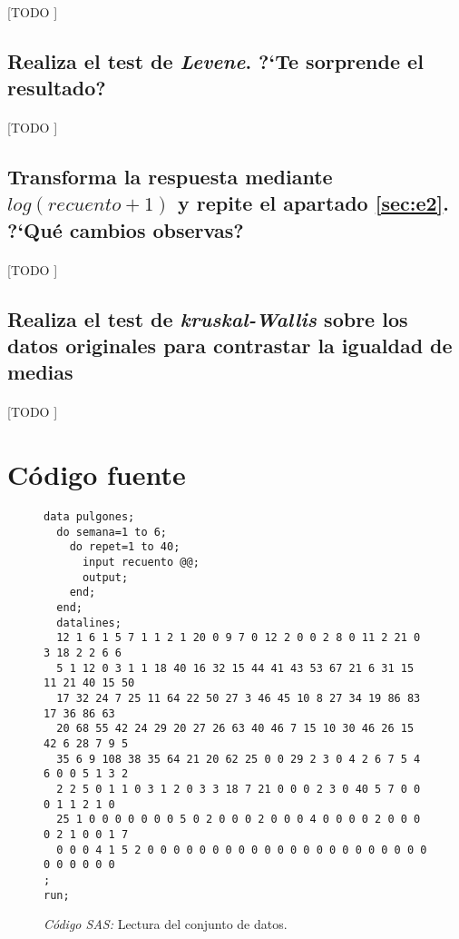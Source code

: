 \documentclass[11pt]{article}
\begin{document}
      \paragraph{}
      [TODO ]


    \subsection{Realiza el test de \emph{Levene}. ?`Te sorprende el resultado?}
    \label{sec:e3}

      \paragraph{}
      [TODO ]


    \subsection{Transforma la respuesta mediante $log(recuento + 1)$ y repite el apartado \ref{sec:e2}. ?`Qué cambios observas?}
    \label{sec:e4}

      \paragraph{}
      [TODO ]


    \subsection{Realiza el test de \emph{kruskal-Wallis} sobre los datos originales para contrastar la igualdad de medias}
    \label{sec:e5}
      \paragraph{}
      [TODO ]

  \section{Código fuente}
  \label{sec:code}

    \begin{figure}
      \centering
      \begin{verbatim}
data pulgones;
  do semana=1 to 6;
    do repet=1 to 40;
      input recuento @@;
      output;
    end;
  end;
  datalines;
  12 1 6 1 5 7 1 1 2 1 20 0 9 7 0 12 2 0 0 2 8 0 11 2 21 0 3 18 2 2 6 6
  5 1 12 0 3 1 1 18 40 16 32 15 44 41 43 53 67 21 6 31 15 11 21 40 15 50
  17 32 24 7 25 11 64 22 50 27 3 46 45 10 8 27 34 19 86 83 17 36 86 63
  20 68 55 42 24 29 20 27 26 63 40 46 7 15 10 30 46 26 15 42 6 28 7 9 5
  35 6 9 108 38 35 64 21 20 62 25 0 0 29 2 3 0 4 2 6 7 5 4 6 0 0 5 1 3 2
  2 2 5 0 1 1 0 3 1 2 0 3 3 18 7 21 0 0 0 2 3 0 40 5 7 0 0 0 1 1 2 1 0
  25 1 0 0 0 0 0 0 0 5 0 2 0 0 0 2 0 0 0 4 0 0 0 0 2 0 0 0 0 2 1 0 0 1 7
  0 0 0 4 1 5 2 0 0 0 0 0 0 0 0 0 0 0 0 0 0 0 0 0 0 0 0 0 0 0 0 0 0 0 0
;
run;
      \end{verbatim}
      \caption{\emph{Código SAS:} Lectura del conjunto de datos.}
      \label{code:sas_1}
    \end{figure}
\end{document}
